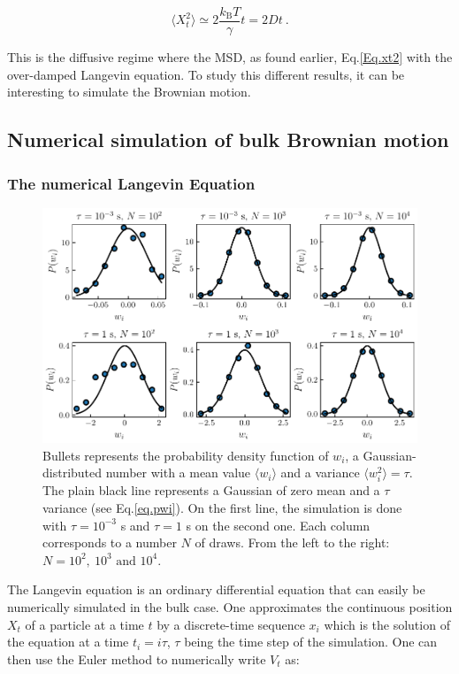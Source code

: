 \begin{equation}
	\langle X_t ^2 \rangle \simeq 2 \frac{k_\mathrm{B}T}{\gamma} t = 2Dt ~.
	\label{eq:longtimemsd}
\end{equation}

This is the diffusive regime where the \gls{MSD}, as found earlier, Eq.\ref{Eq.xt2} with the over-damped Langevin equation. To study this different results, it can be interesting to simulate the Brownian motion.

\subsection{Numerical simulation of bulk Brownian motion}

\subsubsection{The numerical Langevin Equation}

\begin{figure}[!hb]
	\centering
	\includegraphics{02_body/chapter1/image/noise_simulation/exemple.pdf}
	\caption{Bullets represents the probability density function of $w_i$, a Gaussian-distributed number with a mean value $\langle w_i \rangle$ and a variance $\langle w_i ^2 \rangle  = \tau$. The plain black line represents a Gaussian of zero mean and a $\tau$ variance (see Eq.\ref{eq.pwi}). On the first line, the simulation is done with $\tau = 10^{-3}$ s and $\tau = 1$ s on the second one. Each column corresponds to a number $N$ of draws. From the left to the right: $N=10^2, ~10^3 \text{ and } 10^4$. }
	\label{fig:exempleprecisionwi}
\end{figure}


The Langevin equation is an ordinary differential equation that can easily be numerically simulated in the bulk case. One approximates the continuous position $X_t$ of a particle at a time $t$ by a discrete-time sequence $x_i$ which is the solution of the equation at a time $t_i = i  \tau$, $\tau$ being the time step of the simulation. One can then use the Euler method to numerically write $V_t$ as:


